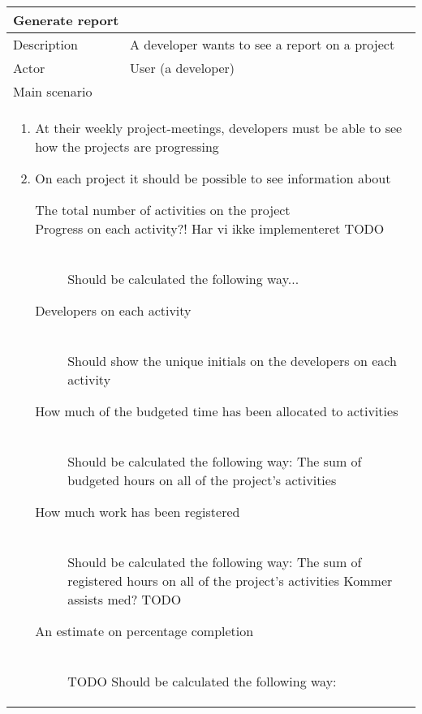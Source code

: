 \begin{table}[H]
  \begin{tabular}{|l|l|}
    \multicolumn{2}{l}{
      \bf{Generate report}
    }
    \\ \hline
    Description & A developer wants to see a report on a project
    \\ \hline
    Actor & User (a developer)
    \\ \hline \multicolumn{2}{|l|}{
      Main scenario 
    }
    \\ \hline \multicolumn{2}{|l|}{ \parbox{\textwidth}{
        \begin{enumerate}        
        \item{At their weekly project-meetings, developers must be able to see how the projects are progressing}
        \item{On each project it should be possible to see information about}
          \begin{description}
          \item[The total number of activities on the project] {}

          \item[Progress on each activity?! Har vi ikke implementeret TODO] \hfill \\
            {Should be calculated the following way...}
			
			\item[Developers on each activity]\hfill \\
            {Should show the unique initials on the developers on each activity}

          \item[How much of the budgeted time has been allocated to activities]\hfill \\
            {Should be calculated the following way:
              The sum of budgeted hours on all of the project's activities}

          \item[How much work has been registered]\hfill \\
            {Should be calculated the following way:
              The sum of registered hours on all of the project's activities
              Kommer assists med? TODO}

          \item[An estimate on percentage completion]\hfill \\
            {TODO Should be calculated the following way:}


\end{description}
\end{enumerate}}}
\end{tabular}
\end{table}
